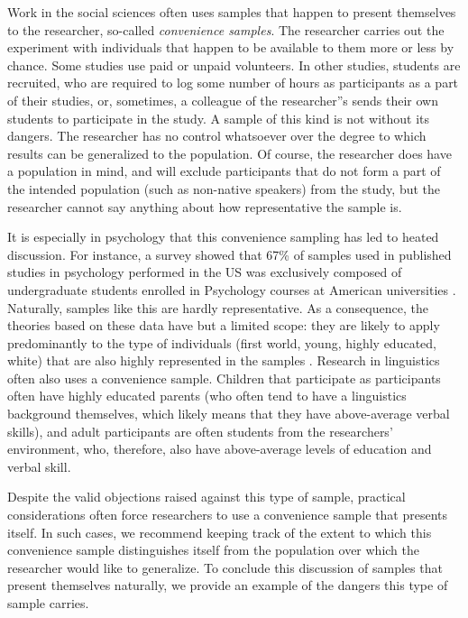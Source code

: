 \documentclass[
]{book}
\begin{document}
Work in the social sciences often uses samples that happen to present themselves to the researcher, so-called \emph{convenience samples}. The researcher carries out the experiment with individuals that happen to be available to them more or less by chance. Some studies use paid or unpaid volunteers. In other studies, students are recruited, who are required to log some number of hours as participants as a part of their studies, or, sometimes, a colleague of the researcher''s sends their own students to participate in the study. A sample of this kind is not without its dangers. The researcher has no control whatsoever over the degree to which results can be generalized to the population. Of course, the researcher does have a population in mind, and will exclude participants that do not form a part of the intended population (such as non-native speakers) from the study, but the researcher cannot say anything about how representative the sample is.

It is especially in psychology that this convenience sampling has led to heated discussion. For instance, a survey showed that 67\% of samples used in published studies in psychology performed in the US was exclusively composed of undergraduate students enrolled in Psychology courses at American universities \citep{Henr10}. Naturally, samples like this are hardly representative. As a consequence, the theories based on these data have but a limited scope: they are likely to apply predominantly to the type of individuals (first world, young, highly educated, white) that are also highly represented in the samples \citep{Henr10}. Research in linguistics often also uses a convenience sample. Children that participate as participants often have highly educated parents (who often tend to have a linguistics background themselves, which likely means that they have above-average verbal skills), and adult participants are often students from the researchers' environment, who, therefore, also have above-average levels of education and verbal skill.

Despite the valid objections raised against this type of sample, practical considerations often force researchers to use a convenience sample that presents itself. In such cases, we recommend keeping track of the extent to which this convenience sample distinguishes itself from the population over which the researcher would like to generalize. To conclude this discussion of samples that present themselves naturally, we provide an example of the dangers this type of sample carries.
\end{document}
